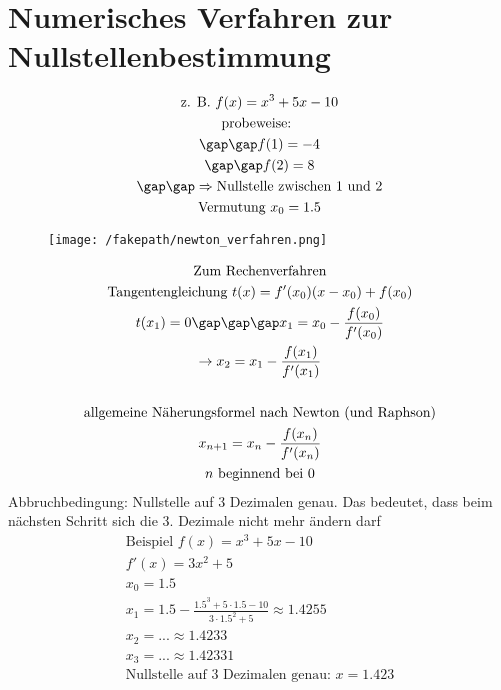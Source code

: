 \section{Numerisches Verfahren zur Nullstellenbestimmung}
\begin{gather*}
  \text{z. B. } f(x) = x^3 + 5x - 10 \\
  \text{probeweise: } \\
  \gap\gap f(1) = -4 \\
  \gap\gap f(2) = 8 \\
  \gap\gap \Rightarrow \text{Nullstelle zwischen 1 und 2} \\
  \text{Vermutung } x_0 = 1.5
\end{gather*}
\begin{figure}[H]
  \centering
  \texttt{[image: /fakepath/newton\_verfahren.png]}
\end{figure}
\begin{gather*}
  \text{Zum Rechenverfahren} \\
  \text{Tangentengleichung } t(x) = f'(x_0)(x - x_0) + f(x_0) \\
  t(x_1) = 0 \gap\gap\gap x_1 = x_0 - \frac{f(x_0)}{f'(x_0)} \\
  \rightarrow x_2 = x_1 - \frac{f(x_1)}{f'(x_1)} \\\\
  \text{allgemeine Näherungsformel nach Newton (und Raphson)} \\
  x_{n + 1} = x_n - \frac{f(x_n)}{f'(x_n)} \\
  n \text{ beginnend bei 0}
\end{gather*}
Abbruchbedingung: Nullstelle auf 3 Dezimalen genau. Das bedeutet, dass beim nächsten Schritt sich die 3. Dezimale nicht mehr ändern darf
\begin{gather*}
  \text{Beispiel } f(x) = x^3 + 5x - 10 \\
  f'(x) = 3x^2 + 5 \\
  x_0 = 1.5 \\
  x_1 = 1.5 - \frac{1.5^3 + 5 \cdot 1.5 - 10}{3 \cdot 1.5^2 + 5} \approx 1.4255 \\
  x_2 = ... \approx 1.4233 \\
  x_3 = ... \approx 1.42331 \\
  \text{Nullstelle auf 3 Dezimalen genau: } x = 1.423
\end{gather*}
